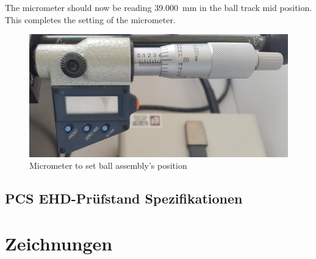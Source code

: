\begin{appendices}
    The micrometer should now be reading \SI{39.000}{\mm} in the ball track mid position.
    This completes the setting of the micrometer.
    \begin{figure}[htb]
        \centering
        \includegraphics[width=0.8\linewidth]{./images/micrometer.jpg}
        \caption{Micrometer to set ball assembly's position}
        \label{fig:micrometer_ball_assembly_position}
    \end{figure}


    \section{PCS EHD-Prüfstand Spezifikationen}
        

    \chapter{Zeichnungen}
\end{appendices}
